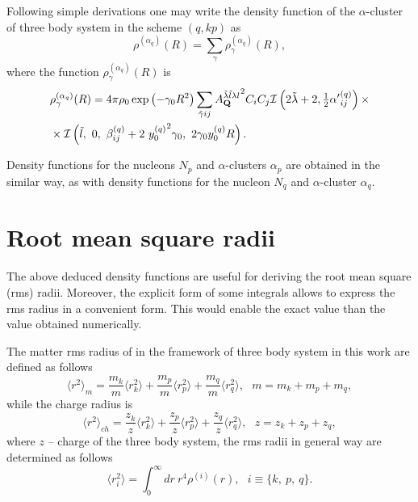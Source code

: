 \documentclass[
12pt, %
oneside, %
english, %
onehalfspacing, %
onehalfspacing, %
headsepline, %
]{MastersDoctoralThesis} %
\begin{document}
Following simple derivations one may write the density function of the $\alpha$-cluster of three body system in the scheme ${(q,kp)}$  as
\begin{equation}
\rho^{(\alpha_q)}(R)=\sum_{\gamma}\rho^{(\alpha_q)}_{\gamma}(R),
\label{rho_alpha_q}
\end{equation}
where the function $\rho^{(\alpha_q)}_{\gamma}(R)$ is
\begin{align}
&\rho_\gamma^{(\alpha_q)}(R)=
4 \pi \rho_0 \exp\left(-\gamma_0 R^2 \right)
\sum_{\tilde{\gamma}ij} 
{A^{\tilde{\lambda} \tilde{l} \lambda l}_{{\bf Q} }}^2
  C_i C_j 
 \mathcal{I}\left( 2\tilde{\lambda}+2, \tfrac{1}{2} {\alpha'}^{(q)}_{ij}\right) \times \\
 & \times \mathcal{I}\left( \tilde{l},~0,~\beta_{ij}^{(q)}+2~{y^{(q)}_0}^2 \gamma_0, ~2 \gamma_0 y^{(q)}_0 R \right).
 \nonumber
\end{align}

Density functions for the nucleons $N_p$ and $\alpha$-clusters $\alpha_p$ are obtained in the similar way, as with density functions for the nucleon $N_q$ and $\alpha$-cluster $\alpha_q$.



\section{Root mean square radii}
The above deduced density functions are useful for deriving the root mean square (rms) radii. Moreover, the explicit form of some integrals allows to express the rms radius in a convenient form. This would enable the exact value than the value obtained numerically.

The matter rms radius of in the framework of three body system in this work are defined as follows
\begin{equation}
\langle r^2 \rangle_m = 
\frac{m_k}{m} \langle r^2_k \rangle 
+ \frac{m_p}{m} \langle r^2_p \rangle 
+\frac{m_q}{m} \langle r^2_q \rangle, ~~~m=m_k+m_p+m_q,
\end{equation}
while the charge radius is
\begin{equation}
\langle r^2 \rangle_{ch} = 
\frac{z_k}{z} \langle r^2_k \rangle 
+ \frac{z_p}{z} \langle r^2_p \rangle 
+\frac{z_q}{z} \langle r^2_q \rangle,~~~z=z_k+z_p+z_q,
\end{equation}
where $z$ -- charge of the three body system, the rms radii in general way are determined as follows
\begin{equation}
\langle r^2_i \rangle = 
\int_0^{\infty} dr~ r^{4} \rho^{(i)}(r),~~~i\equiv\{k,~p,~q\}.
\label{rms_general}
\end{equation}
\end{document}
